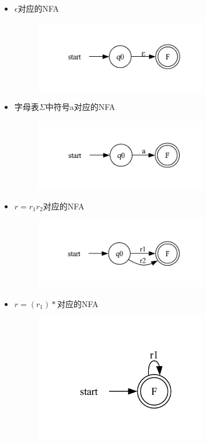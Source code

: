 \documentclass[UTF8]{ctexart} %
\begin{document}
\begin{itemize}
    \item $\epsilon$对应的NFA
          \begin{figure}[H]
              \centering
              \includegraphics[width=0.7\textwidth]{assets/空串NFA.pdf}
          \end{figure}
    \item 字母表$\Sigma$中符号a对应的NFA
          \begin{figure}[H]
              \centering
              \includegraphics[width=0.7\textwidth]{assets/aNFA.pdf}
          \end{figure}
    \item $r=r_1r_2$对应的NFA
          \begin{figure}[H]
              \centering
              \includegraphics[width=0.7\textwidth]{assets/r1orr2NFA.pdf}
          \end{figure}
    \item $r=(r_1)*$对应的NFA
          \begin{figure}[H]
              \centering
              \includegraphics[width=0.7\textwidth]{assets/r1NFA.pdf}

\end{figure}
\end{itemize}
\end{document}
